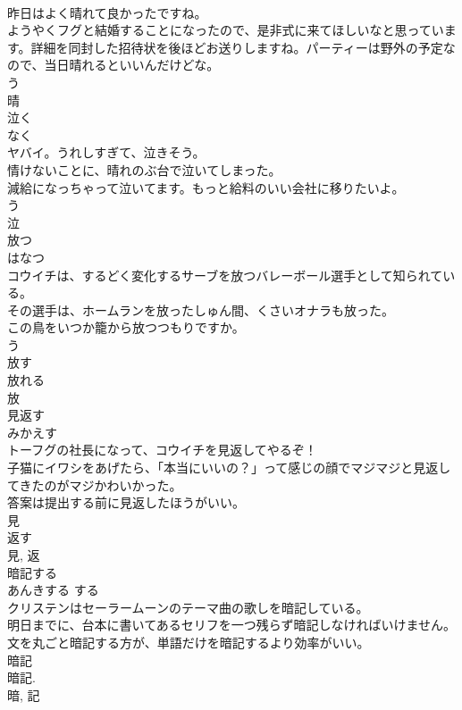\documentclass[8pt]{extreport}
\begin{document}
\begin{CJK}{UTF8}{min}
\\	昨日はよく晴れて良かったですね。	
\\	ようやくフグと結婚することになったので、是非式に来てほしいなと思っています。詳細を同封した招待状を後ほどお送りしますね。パーティーは野外の予定なので、当日晴れるといいんだけどな。	
\\	う 
\\	晴	
\\	泣く	
\\	なく	
\\	ヤバイ。うれしすぎて、泣きそう。	
\\	情けないことに、晴れのぶ台で泣いてしまった。	
\\	減給になっちゃって泣いてます。もっと給料のいい会社に移りたいよ。	
\\	う 
\\	泣	
\\	放つ	
\\	はなつ	
\\	コウイチは、するどく変化するサーブを放つバレーボール選手として知られている。	
\\	その選手は、ホームランを放ったしゅん間、くさいオナラも放った。	
\\	この鳥をいつか籠から放つつもりですか。	
\\	う 
\\	放す 
\\	放れる 
\\	放	
\\	見返す	
\\	みかえす	
\\	トーフグの社長になって、コウイチを見返してやるぞ！	
\\	子猫にイワシをあげたら、「本当にいいの？」って感じの顔でマジマジと見返してきたのがマジかわいかった。	
\\	答案は提出する前に見返したほうがいい。	
\\	見 
\\	返す 
\\	見, 返	
\\	暗記する	
\\	あんきする	する 
\\	クリステンはセーラームーンのテーマ曲の歌しを暗記している。	
\\	明日までに、台本に書いてあるセリフを一つ残らず暗記しなければいけません。	
\\	文を丸ごと暗記する方が、単語だけを暗記するより効率がいい。	
\\	暗記 
\\	暗記. 
\\	暗, 記	

\end{CJK}
\end{document}
